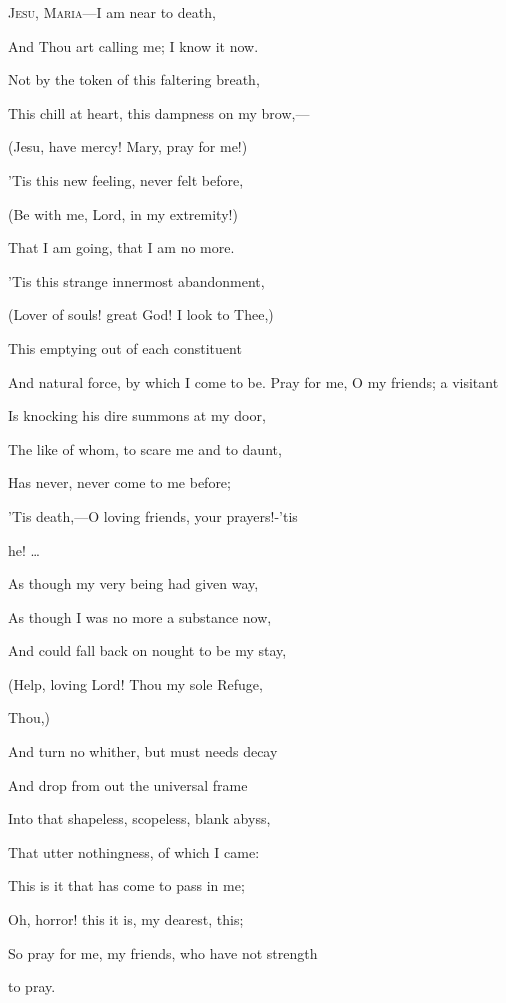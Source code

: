 

J\textsc{esu}, M\textsc{aria}—I am near to death,

And Thou art calling me; I know it now.

Not by the token of this faltering breath,

This chill at heart, this dampness on
my brow,—

(Jesu, have mercy! Mary, pray for me!)

'Tis this new feeling, never felt
before,

(Be with me, Lord, in my extremity!)

That I am going, that I am no more.

'Tis this strange innermost abandonment,

(Lover of souls! great God! I look to
Thee,)

This emptying out of each constituent

And natural force, by which I come to
be. Pray for me, O my friends; a visitant

Is knocking his dire summons at my
door,

The like of whom, to scare me and to daunt,

Has never, never come to me before;

'Tis death,—O loving friends, your prayers!-'tis

he! …

As though my very being had given way,

As though I was no more a substance
now,

And could fall back on nought to be my stay,

(Help, loving Lord! Thou my sole
Refuge,

Thou,)

And turn no whither, but must needs decay

And drop from out the universal frame

Into that shapeless, scopeless, blank abyss,

That utter nothingness, of which I
came:

This is it that has come to pass in me;

Oh, horror! this it is, my dearest,
this;

So pray for me, my friends, who have not strength

to pray.


